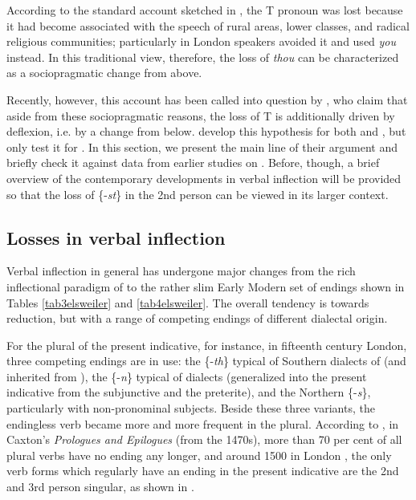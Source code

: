 \documentclass[output=paper,hidelinks]{langscibook}
\begin{document}
According to the standard account sketched in , the T pronoun was lost because it had become associated with the speech of rural areas, lower classes, and radical religious communities; particularly in London \citep[e.g.][224]{Finkenstaedt1963} speakers avoided it and used \textit{you} instead. In this traditional view, therefore, the loss of \textit{thou} can be characterized as a sociopragmatic change from above.

Recently, however, this account has been called into question by \citet{Aalberse2015}, who claim that aside from these sociopragmatic reasons, the loss of T is additionally driven by deflexion, i.e. by a change from below. \citeauthor{Aalberse2015} develop this hypothesis for both  and , but only test it for . In this section, we present the main line of their argument and briefly check it against data from earlier studies on . Before, though, a brief overview of the contemporary developments in verbal inflection will be provided so that the loss of \{-\textit{st}\} in the 2nd person can be viewed in its larger context.

\subsection{Losses in verbal inflection}\label{sec:eh:5.1}

Verbal inflection in general has undergone major changes from the rich inflectional paradigm of  to the rather slim Early Modern set of endings shown in Tables \ref{tab3elsweiler} and \ref{tab4elsweiler}. The overall tendency is towards reduction, but with a range of competing endings of different dialectal origin. 

For the plural of the present indicative, for instance, in fifteenth century London, three competing endings are in use: the \{-\textit{th}\} typical of Southern dialects of  (and inherited from ), the \{-\textit{n}\} typical of  dialects (generalized into the present indicative from the subjunctive and the preterite), and the Northern \{-\textit{s}\}, particularly with non-pronominal subjects. Beside these three variants, the endingless verb became more and more frequent in the plural. According to \citet[97]{Lass1992}, in Caxton’s \textit{Prologues and Epilogues} (from the 1470s), more than 70 per cent of all plural verbs have no ending any longer, and around 1500 in London , the only verb forms which regularly have an ending in the present indicative are the 2nd and 3rd person singular, as shown in  \citep[based on][161]{Lass1999}.
\end{document}
